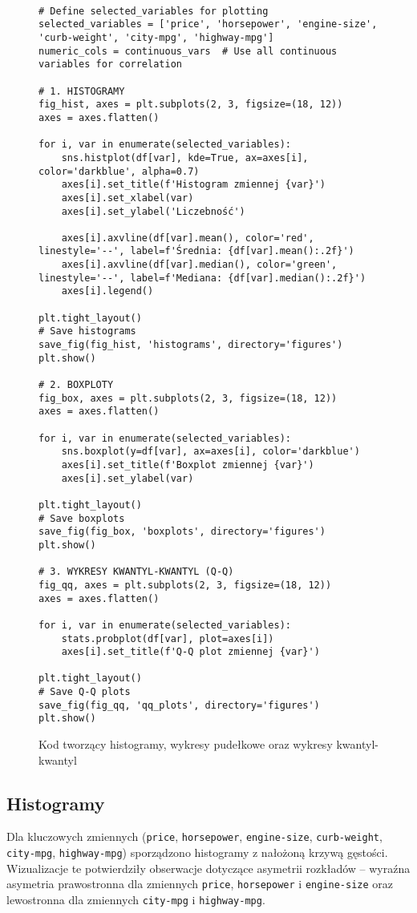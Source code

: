\documentclass[12pt,a4paper]{article}
\newcommand{\kod}[2]{
    \begin{figure}[H]
        \begin{lstlisting}[style=pythonstyle]
#1
        \end{lstlisting}
        \caption{#2}
    \end{figure}
}
\begin{document}
\kod{
# Define selected_variables for plotting
selected_variables = ['price', 'horsepower', 'engine-size', 'curb-weight', 'city-mpg', 'highway-mpg']
numeric_cols = continuous_vars  # Use all continuous variables for correlation

# 1. HISTOGRAMY
fig_hist, axes = plt.subplots(2, 3, figsize=(18, 12))
axes = axes.flatten()

for i, var in enumerate(selected_variables):
    sns.histplot(df[var], kde=True, ax=axes[i], color='darkblue', alpha=0.7)
    axes[i].set_title(f'Histogram zmiennej {var}')
    axes[i].set_xlabel(var)
    axes[i].set_ylabel('Liczebność')
    
    axes[i].axvline(df[var].mean(), color='red', linestyle='--', label=f'Średnia: {df[var].mean():.2f}')
    axes[i].axvline(df[var].median(), color='green', linestyle='--', label=f'Mediana: {df[var].median():.2f}')
    axes[i].legend()

plt.tight_layout()
# Save histograms
save_fig(fig_hist, 'histograms', directory='figures')
plt.show()

# 2. BOXPLOTY
fig_box, axes = plt.subplots(2, 3, figsize=(18, 12))
axes = axes.flatten()

for i, var in enumerate(selected_variables):
    sns.boxplot(y=df[var], ax=axes[i], color='darkblue')
    axes[i].set_title(f'Boxplot zmiennej {var}')
    axes[i].set_ylabel(var)

plt.tight_layout()
# Save boxplots
save_fig(fig_box, 'boxplots', directory='figures')
plt.show()

# 3. WYKRESY KWANTYL-KWANTYL (Q-Q)
fig_qq, axes = plt.subplots(2, 3, figsize=(18, 12))
axes = axes.flatten()

for i, var in enumerate(selected_variables):
    stats.probplot(df[var], plot=axes[i])
    axes[i].set_title(f'Q-Q plot zmiennej {var}')

plt.tight_layout()
# Save Q-Q plots
save_fig(fig_qq, 'qq_plots', directory='figures')
plt.show()
}{Kod tworzący histogramy, wykresy pudełkowe oraz wykresy kwantyl-kwantyl}

\subsection{Histogramy}

Dla kluczowych zmiennych (\texttt{price}, \texttt{horsepower}, \texttt{engine-size}, \texttt{curb-weight}, \texttt{city-mpg}, \texttt{highway-mpg}) sporządzono histogramy z nałożoną krzywą gęstości. Wizualizacje te potwierdziły obserwacje dotyczące asymetrii rozkładów – wyraźna asymetria prawostronna dla zmiennych \texttt{price}, \texttt{horsepower} i \texttt{engine-size} oraz lewostronna dla zmiennych \texttt{city-mpg} i \texttt{highway-mpg}.
\end{document}

